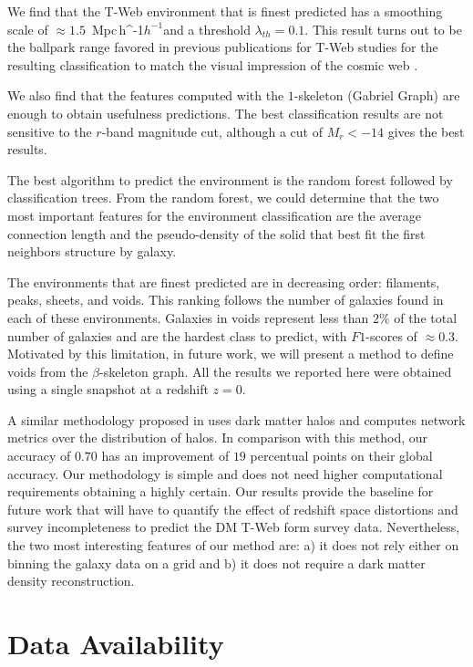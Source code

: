 \documentclass[usenatbib]{mnras}
\newcommand{\Mpch}{\,{\rm Mpc}\,\ifmmode h^{-1}\else $h^{-1}$\fi}
\begin{document}
We find that the T-Web environment that is finest predicted has a smoothing scale of $\approx1.5$ \Mpch and a threshold $\lambda_{th}=0.1$. 
This result turns out to be the ballpark range favored in previous publications for T-Web studies for the resulting classification to match the visual impression of the cosmic web \citep{Forero-Romero2009}.

We also find that the features computed with the $1$-skeleton 
(Gabriel Graph) are enough to obtain usefulness predictions. 
The best classification results are not sensitive to the $r$-band
magnitude cut, although a cut of $M_r<-14$ gives the best results.

The best algorithm to predict the environment is the random forest followed by classification trees. From the random forest, we could determine that the two most important features for the environment classification are the average connection length and the pseudo-density of the solid that best fit the first neighbors structure by galaxy.

The environments that are finest predicted are in decreasing order: 
filaments, peaks, sheets, and voids. This ranking follows the number of galaxies found in each of these environments. Galaxies in voids represent less than $2\%$ of the total number of galaxies and are the hardest class to predict, with $F1$-scores of $\approx0.3$. Motivated by this limitation, in future work, we will present a method to define voids from the $\beta$-skeleton graph. All the results we reported here were obtained using a single snapshot at a redshift $z=0$. 

A similar methodology proposed in \cite{Tsizh2019} uses dark matter halos and computes network metrics over the distribution of halos. In comparison with this method, our accuracy of $0.70$ has an improvement of $19$ percentual points on their global accuracy. Our methodology is simple and does not need higher computational requirements obtaining a highly certain. Our results provide the baseline for future work that will have to quantify the effect of redshift space distortions and survey incompleteness to predict the DM T-Web form survey data.
Nevertheless, the two most interesting features of our method are: a) it does not rely either on binning the galaxy data on a grid and b) it does not require a dark matter density reconstruction.


\section*{Data Availability}
\end{document}
